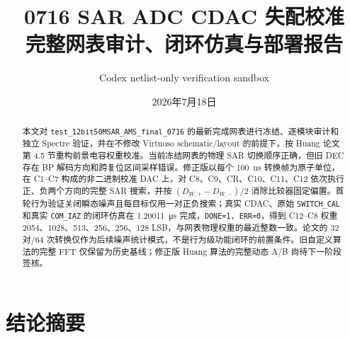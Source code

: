 \documentclass[UTF8,a4paper,11pt]{ctexart}
\title{0716 SAR ADC CDAC 失配校准\\完整网表审计、闭环仿真与部署报告}
\author{Codex netlist-only verification sandbox}
\date{2026年7月18日}
\newcommand{\code}[1]{\texttt{#1}}
\begin{document}
\maketitle

\begin{abstract}
本文对 \code{test\_12bit50MSAR\_AMS\_final\_0716} 的最新完成网表进行冻结、逐模块审计和独立 Spectre 验证，并在不修改 Virtuoso schematic/layout 的前提下，按 Huang 论文第 4.5 节重构前景电容权重校准。当前冻结网表的物理 SAR 切换顺序正确，但旧 DEC 存在 BP 解码方向和跨复位区间采样错误。修正版以每个 \SI{100}{ns} 转换帧为原子单位，在 C1--C7 构成的非二进制校准 DAC 上，对 C8、C9、CR、C10、C11、C12 依次执行正、负两个方向的完整 SAR 搜索，并按 $(D_{W,+}-D_{W,-})/2$ 消除比较器固定偏置。首轮行为验证关闭瞬态噪声且每目标仅用一对正负搜索；真实 CDAC、原始 \code{SWITCH\_CAL} 和真实 \code{COM\_IAZ} 的闭环仿真在 \SI{1.20011}{\micro s} 完成，\code{DONE=1, ERR=0}，得到 C12--C8 权重 2054、1028、513、256、256、128 LSB，与网表物理权重的最近整数一致。论文的 32 对/64 次转换仅作为后续噪声统计模式，不是行为级功能闭环的前置条件。旧自定义算法的完整 FFT 仅保留为历史基线；修正版 Huang 算法的完整动态 A/B 尚待下一阶段签核。
\end{abstract}

\section{结论摘要}
\end{document}
